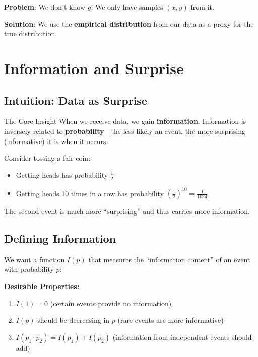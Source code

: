 \textbf{Problem}: We don't know $g$! We only have samples $(x, y)$ from it.

\textbf{Solution}: We use the \textbf{empirical distribution} from our data as a proxy for the true distribution.

\section{Information and Surprise}

\subsection{Intuition: Data as Surprise}

\begin{infobox}{The Core Insight}
When we receive data, we gain \textbf{information}. Information is inversely related to \textbf{probability}---the less likely an event, the more surprising (informative) it is when it occurs.
\end{infobox}

Consider tossing a fair coin:
\begin{itemize}
    \item Getting heads has probability $\frac{1}{2}$
    \item Getting heads 10 times in a row has probability $\left(\frac{1}{2}\right)^{10} = \frac{1}{1024}$
\end{itemize}
The second event is much more ``surprising'' and thus carries more information.

\subsection{Defining Information}

We want a function $I(p)$ that measures the ``information content'' of an event with probability $p$:

\textbf{Desirable Properties:}
\begin{enumerate}
    \item $I(1) = 0$ (certain events provide no information)
    \item $I(p)$ should be decreasing in $p$ (rare events are more informative)
    \item $I(p_1 \cdot p_2) = I(p_1) + I(p_2)$ (information from independent events should add)
\end{enumerate}

